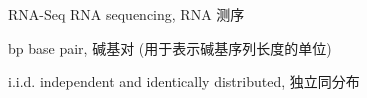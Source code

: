 \begin{denotation}

\item[RNA-Seq] RNA sequencing, RNA 测序

\item[bp] base pair, 碱基对 (用于表示碱基序列长度的单位)

\item[i.i.d.] independent and identically distributed, 独立同分布

\end{denotation}
